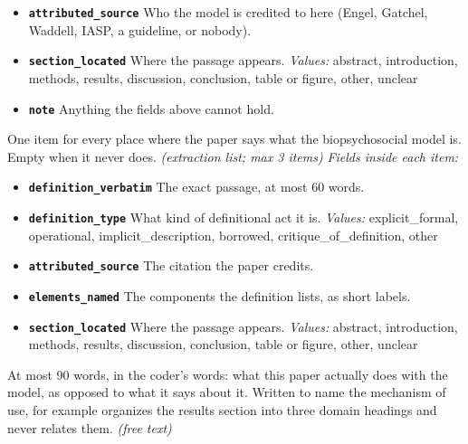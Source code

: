 \documentclass[11pt]{article}
\begin{document}
\begin{description}
\begin{itemize}[leftmargin=1.3em,itemsep=1pt,topsep=2pt]
  \item \textbf{\texttt{attributed\_source}} Who the model is credited to here (Engel, Gatchel, Waddell, IASP, a guideline, or nobody).
  \item \textbf{\texttt{section\_located}} Where the passage appears. {\small \textit{Values:} abstract, introduction, methods, results, discussion, conclusion, table or figure, other, unclear}
  \item \textbf{\texttt{note}} Anything the fields above cannot hold.
  \end{itemize}
\item[\texttt{bps\_definitions}] One item for every place where the paper says what the biopsychosocial model is. Empty when it never does. \textit{(extraction list; max 3 items)}
  {\small\itshape Fields inside each item:}
  \begin{itemize}[leftmargin=1.3em,itemsep=1pt,topsep=2pt]
  \item \textbf{\texttt{definition\_verbatim}} The exact passage, at most 60 words.
  \item \textbf{\texttt{definition\_type}} What kind of definitional act it is. {\small \textit{Values:} explicit\_formal, operational, implicit\_description, borrowed, critique\_of\_definition, other}
  \item \textbf{\texttt{attributed\_source}} The citation the paper credits.
  \item \textbf{\texttt{elements\_named}} The components the definition lists, as short labels.
  \item \textbf{\texttt{section\_located}} Where the passage appears. {\small \textit{Values:} abstract, introduction, methods, results, discussion, conclusion, table or figure, other, unclear}
  \end{itemize}
\item[\texttt{bps\_operationalization\_summary}] At most 90 words, in the coder's words: what this paper actually does with the model, as opposed to what it says about it. Written to name the mechanism of use, for example organizes the results section into three domain headings and never relates them. \textit{(free text)}
\end{description}
\end{document}
